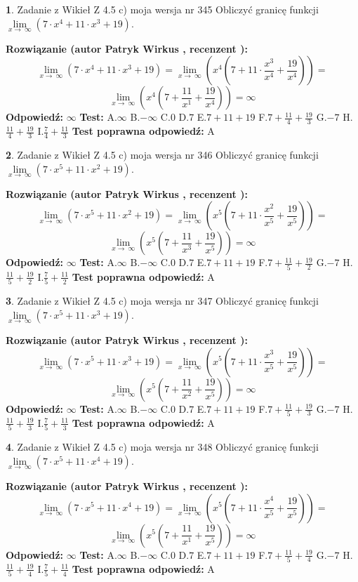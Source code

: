 \documentclass[12pt, a4paper]{article}
\theoremstyle{definition} %
\newtheorem{zad}{}
\newcommand{\zadStart}[1]{\begin{zad}#1\newline}
\newcommand{\zadStop}{\end{zad}}
\newcommand{\rozwStart}[2]{\noindent \textbf{Rozwiązanie (autor #1 , recenzent #2): }\newline}
\newcommand{\rozwStop}{\newline}
\newcommand{\odpStart}{\noindent \textbf{Odpowiedź:}\newline}
\newcommand{\odpStop}{\newline}
\newcommand{\testStart}{\noindent \textbf{Test:}\newline}
\newcommand{\testStop}{\newline}
\newcommand{\kluczStart}{\noindent \textbf{Test poprawna odpowiedź:}\newline}
\newcommand{\kluczStop}{\newline}
\begin{document}
\zadStart{Zadanie z Wikieł Z 4.5 c) moja wersja nr 345}
Obliczyć granicę funkcji  $\lim\limits_{x\to\ \infty}(7 \cdot x^{4}+11 \cdot x^{3}+19)$.
\zadStop
\rozwStart{Patryk Wirkus}{}
$$\lim\limits_{x\to\ \infty}(7 \cdot x^{4}+11 \cdot x^{3}+19) = \lim\limits_{x\to\ \infty}(x^{4}(7 +11 \cdot \frac{x^{3}}{x^{4}}+\frac{19}{x^{4}})) =$$ $$\lim\limits_{x\to\ \infty}(x^{4}(7 +\frac{11}{x^{1}}+\frac{19}{x^{4}})) =\infty$$
\rozwStop
\odpStart
$\infty$
\odpStop
\testStart
A.$\infty$ B.$-\infty$ C.$0$ D.$7$ E.$7 + 11 + 19$
F.$7+\frac{11}{4}+\frac{19}{3}$ G.$-7$
H.$\frac{11}{4}+\frac{19}{3}$
I.$\frac{7}{4}+\frac{11}{3}$
\testStop
\kluczStart
A
\kluczStop



\zadStart{Zadanie z Wikieł Z 4.5 c) moja wersja nr 346}
Obliczyć granicę funkcji  $\lim\limits_{x\to\ \infty}(7 \cdot x^{5}+11 \cdot x^{2}+19)$.
\zadStop
\rozwStart{Patryk Wirkus}{}
$$\lim\limits_{x\to\ \infty}(7 \cdot x^{5}+11 \cdot x^{2}+19) = \lim\limits_{x\to\ \infty}(x^{5}(7 +11 \cdot \frac{x^{2}}{x^{5}}+\frac{19}{x^{5}})) =$$ $$\lim\limits_{x\to\ \infty}(x^{5}(7 +\frac{11}{x^{3}}+\frac{19}{x^{5}})) =\infty$$
\rozwStop
\odpStart
$\infty$
\odpStop
\testStart
A.$\infty$ B.$-\infty$ C.$0$ D.$7$ E.$7 + 11 + 19$
F.$7+\frac{11}{5}+\frac{19}{2}$ G.$-7$
H.$\frac{11}{5}+\frac{19}{2}$
I.$\frac{7}{5}+\frac{11}{2}$
\testStop
\kluczStart
A
\kluczStop



\zadStart{Zadanie z Wikieł Z 4.5 c) moja wersja nr 347}
Obliczyć granicę funkcji  $\lim\limits_{x\to\ \infty}(7 \cdot x^{5}+11 \cdot x^{3}+19)$.
\zadStop
\rozwStart{Patryk Wirkus}{}
$$\lim\limits_{x\to\ \infty}(7 \cdot x^{5}+11 \cdot x^{3}+19) = \lim\limits_{x\to\ \infty}(x^{5}(7 +11 \cdot \frac{x^{3}}{x^{5}}+\frac{19}{x^{5}})) =$$ $$\lim\limits_{x\to\ \infty}(x^{5}(7 +\frac{11}{x^{2}}+\frac{19}{x^{5}})) =\infty$$
\rozwStop
\odpStart
$\infty$
\odpStop
\testStart
A.$\infty$ B.$-\infty$ C.$0$ D.$7$ E.$7 + 11 + 19$
F.$7+\frac{11}{5}+\frac{19}{3}$ G.$-7$
H.$\frac{11}{5}+\frac{19}{3}$
I.$\frac{7}{5}+\frac{11}{3}$
\testStop
\kluczStart
A
\kluczStop



\zadStart{Zadanie z Wikieł Z 4.5 c) moja wersja nr 348}
Obliczyć granicę funkcji  $\lim\limits_{x\to\ \infty}(7 \cdot x^{5}+11 \cdot x^{4}+19)$.
\zadStop
\rozwStart{Patryk Wirkus}{}
$$\lim\limits_{x\to\ \infty}(7 \cdot x^{5}+11 \cdot x^{4}+19) = \lim\limits_{x\to\ \infty}(x^{5}(7 +11 \cdot \frac{x^{4}}{x^{5}}+\frac{19}{x^{5}})) =$$ $$\lim\limits_{x\to\ \infty}(x^{5}(7 +\frac{11}{x^{1}}+\frac{19}{x^{5}})) =\infty$$
\rozwStop
\odpStart
$\infty$
\odpStop
\testStart
A.$\infty$ B.$-\infty$ C.$0$ D.$7$ E.$7 + 11 + 19$
F.$7+\frac{11}{5}+\frac{19}{4}$ G.$-7$
H.$\frac{11}{5}+\frac{19}{4}$
I.$\frac{7}{5}+\frac{11}{4}$
\testStop
\kluczStart
A
\kluczStop
\end{document}
